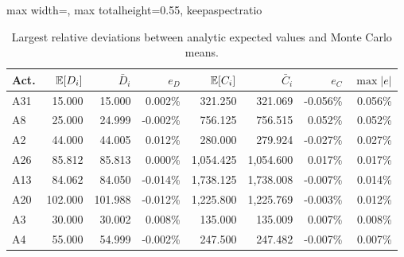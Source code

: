\begin{table}[H]
\centering
\caption{Largest relative deviations between analytic expected values and Monte Carlo means.}
\label{tab:largest-expected-value-errors}
\scriptsize
\setlength{\tabcolsep}{3pt}
\renewcommand{\arraystretch}{0.95}
\begin{adjustbox}{max width=\textwidth, max totalheight=0.55\textheight, keepaspectratio}
\begin{tabular}{@{}lrrrrrrr@{}}
\toprule
Act. & $\mathbb{E}[D_i]$ & $\bar D_i$ & $e_D$ & $\mathbb{E}[C_i]$ & $\bar C_i$ & $e_C$ & $\max |e|$ \\
\midrule
A31 & 15.000 & 15.000 & 0.002\% & 321.250 & 321.069 & -0.056\% & 0.056\% \\
A8 & 25.000 & 24.999 & -0.002\% & 756.125 & 756.515 & 0.052\% & 0.052\% \\
A2 & 44.000 & 44.005 & 0.012\% & 280.000 & 279.924 & -0.027\% & 0.027\% \\
A26 & 85.812 & 85.813 & 0.000\% & 1,054.425 & 1,054.600 & 0.017\% & 0.017\% \\
A13 & 84.062 & 84.050 & -0.014\% & 1,738.125 & 1,738.008 & -0.007\% & 0.014\% \\
A20 & 102.000 & 101.988 & -0.012\% & 1,225.800 & 1,225.769 & -0.003\% & 0.012\% \\
A3 & 30.000 & 30.002 & 0.008\% & 135.000 & 135.009 & 0.007\% & 0.008\% \\
A4 & 55.000 & 54.999 & -0.002\% & 247.500 & 247.482 & -0.007\% & 0.007\% \\
\bottomrule
\end{tabular}
\end{adjustbox}
\end{table}
